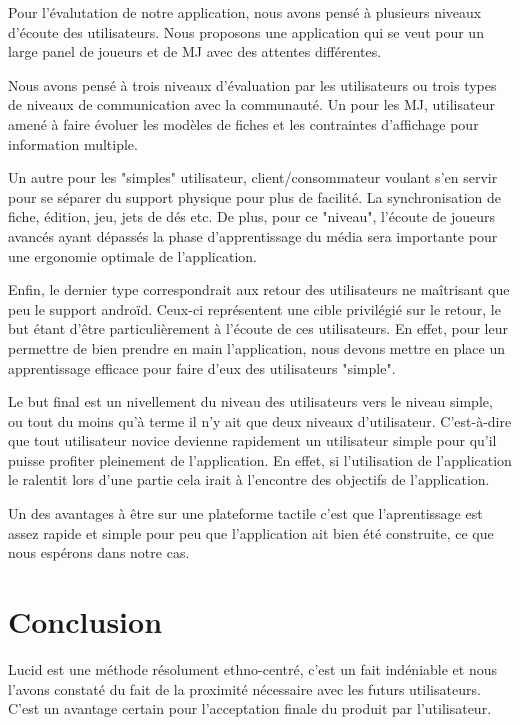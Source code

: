 \documentclass[11pt,a4paper]{article}
\begin{document}
Pour l'évalutation de notre application, nous avons pensé à plusieurs niveaux
d'écoute des utilisateurs. Nous proposons une application qui se veut pour un
large panel de joueurs et de MJ avec des attentes différentes.

Nous avons pensé à trois niveaux d'évaluation par les utilisateurs ou trois
types de niveaux de communication avec la communauté. Un pour les MJ,
utilisateur amené à faire évoluer les modèles de fiches et les contraintes
d'affichage pour information multiple.

Un autre pour les "simples" utilisateur, client/consommateur voulant s'en servir
pour se séparer du support physique pour plus de facilité. La synchronisation de
fiche, édition, jeu, jets de dés etc. De plus, pour ce "niveau", l'écoute de
joueurs avancés ayant dépassés la phase d'apprentissage du média sera
importante pour une ergonomie optimale de l'application.

Enfin, le dernier type correspondrait aux retour des utilisateurs ne maîtrisant
que peu le support androïd. Ceux-ci représentent une cible privilégié sur le
retour, le but étant d'être particulièrement à l'écoute de ces utilisateurs. En
effet, pour leur permettre de bien prendre en main l'application, nous devons
mettre en place un apprentissage efficace pour faire d'eux des utilisateurs
"simple".

Le but final est un nivellement du niveau des utilisateurs vers le niveau
simple, ou tout du moins qu'à terme il n'y ait que deux niveaux d'utilisateur.
C'est-à-dire que tout utilisateur novice devienne rapidement un utilisateur
simple pour qu'il puisse profiter pleinement de l'application. En effet, si
l'utilisation de l'application le ralentit lors d'une partie cela irait à
l'encontre des objectifs de l'application.

Un des avantages à être sur une plateforme tactile c'est que l'aprentissage est
assez rapide et simple pour peu que l'application ait bien été construite, ce
que nous espérons dans notre cas.

\clearpage
\section{Conclusion}

Lucid est une méthode résolument ethno-centré, c'est un fait indéniable et nous
l'avons constaté du fait de la proximité nécessaire avec les futurs
utilisateurs. C'est un avantage certain pour l'acceptation finale du produit par
l'utilisateur.
\end{document}
